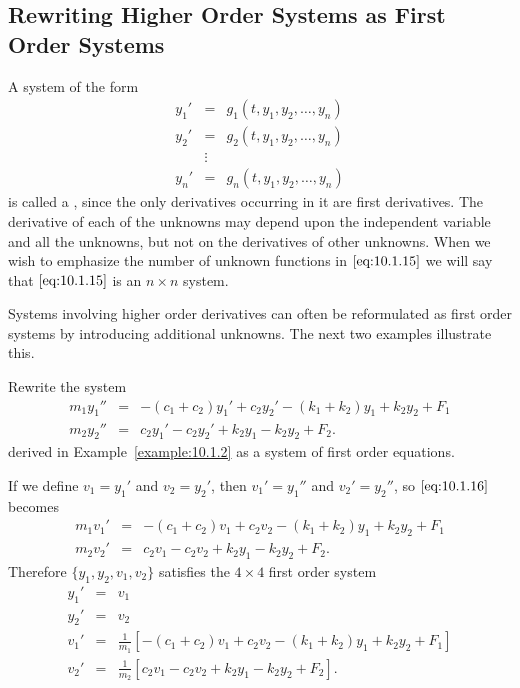 \documentclass{ximera}
\begin{document}
\subsection*{Rewriting Higher Order  Systems as First Order Systems}

A system of the form
\begin{equation} \label{eq:10.1.15}
\begin{array}{ccl}
y_1'&=&g_1(t,y_1,y_2,\dots,y_n)\\
y_2'&=&g_2(t,y_1,y_2,\dots,y_n)\\
&\vdots&\\
y_n'&=&g_n(t,y_1,y_2,\dots,y_n)
\end{array}
\end{equation}
is called a , since the only derivatives
occurring in it are first derivatives. The derivative of
each of the unknowns may depend upon the independent variable and all
the unknowns, but not on the derivatives of other unknowns. When we
wish to emphasize the number of unknown functions in $\eqref{eq:10.1.15}$ we
will say that $\eqref{eq:10.1.15}$ is an $n\times n$ system.

Systems involving higher order derivatives can often be reformulated
as first order systems by introducing additional unknowns. The next
two examples illustrate this.

\begin{example}\label{example:10.1.4}
Rewrite the system
\begin{equation} \label{eq:10.1.16}
\begin{array}{rcl}
m_1y_1''&=&-(c_1+c_2)y_1'+c_2y_2'-(k_1+k_2)y_1+k_2y_2+F_1\\
m_2y_2''&=&c_2y_1'-c_2y_2'+k_2y_1-k_2y_2+F_2.
\end{array}
\end{equation}
derived in Example~\ref{example:10.1.2}  as a system of first order
equations.

\begin{explanation}
If we define $v_1=y_1'$ and $v_2=y_2'$,  then $v_1'=y_1''$ and
$v_2'=y_2''$,  so $\eqref{eq:10.1.16}$ becomes
$$
\begin{array}{rcl}
m_1v_1'&=&-(c_1+c_2)v_1+c_2v_2-(k_1+k_2)y_1+k_2y_2+F_1\\
m_2v_2'&=&c_2v_1-c_2v_2+k_2y_1-k_2y_2+F_2.
\end{array}
$$
Therefore $\{y_1,y_2,v_1,v_2\}$  satisfies the $4\times4$ first order
system
\begin{equation} \label{eq:10.1.17}
\begin{array}{rcl}
y_1'&=&v_1\\
y_2'&=&v_2\\
v_1'&=&\frac{1}{m_1}\left[-(c_1+c_2)v_1+c_2v_2-(k_1+k_2)y_1+k_2y_2+F_1\right]\\
v_2'&=&\frac{1}{m_2}\left[c_2v_1-c_2v_2+k_2y_1-k_2y_2+F_2\right].
 \end{array}
\end{equation}
\end{explanation}
\end{example}
\end{document}
